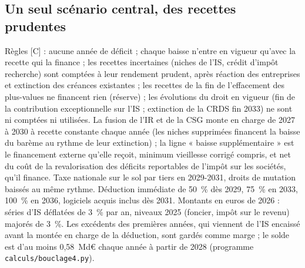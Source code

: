 \subsection{Un seul scénario central, des recettes prudentes}
Règles [C] : aucune année de déficit ; chaque baisse n'entre en vigueur qu'avec la recette qui la finance ; les recettes
incertaines (niches de l'IS, crédit d'impôt recherche) sont comptées à leur rendement prudent, après réaction des
entreprises et extinction des créances existantes ; les recettes de la fin de l'effacement des plus-values ne financent
rien (réserve) ; les évolutions du droit en vigueur (fin de la contribution exceptionnelle sur l'IS ; extinction de la
CRDS fin 2033) ne sont ni comptées ni utilisées. La fusion de l'IR et de la CSG monte en charge de 2027 à 2030 à recette
constante chaque année (les niches supprimées financent la baisse du barème au rythme de leur extinction) ; la ligne
« baisse supplémentaire » est le financement externe qu'elle reçoit, minimum vieillesse corrigé compris, et net du coût de la revalorisation des déficits reportables de l'impôt sur les sociétés, qu'il finance. Taxe
nationale sur le sol par tiers en 2029-2031, droits de mutation baissés au même rythme. Déduction immédiate de 50~\% dès
2029, 75~\% en 2033, 100~\% en 2036, logiciels acquis inclus dès 2031. Montants en euros de 2026 : séries d'IS déflatées de 3~\% par an, niveaux 2025 (foncier, impôt sur le revenu) majorés de 3~\%. Les
excédents des premières années, qui viennent de l'IS encaissé avant la montée en charge de la déduction, sont gardés
comme marge ; le solde est d'au moins 0,58~Md€ chaque année à partir de 2028 (programme
\texttt{calculs/bouclage4.py}).

